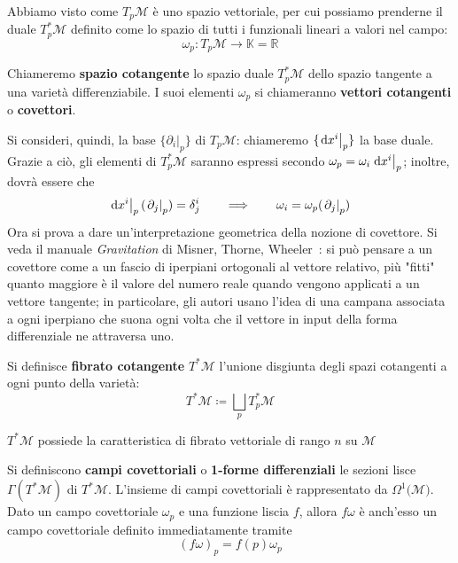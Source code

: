 Abbiamo visto come $T_p\mathcal{M}$ è uno spazio vettoriale, per cui possiamo prenderne il duale $T^*_p\mathcal{M}$ definito come lo spazio di tutti i funzionali lineari a valori nel campo:
\[
    \omega_p : T_p\mathcal{M} \rightarrow \mathbb{K} = \mathbb{R}
\]
\begin{definition}
    Chiameremo \textbf{spazio cotangente} lo spazio duale $T^*_p\mathcal{M}$ dello spazio tangente a una varietà differenziabile.
    I suoi elementi $\omega_p$ si chiameranno \textbf{vettori cotangenti} o \textbf{covettori}.
\end{definition}
Si consideri, quindi, la base $\{ \left.\partial_i\right|_p\}$ di $ T_p\mathcal{M}$: chiameremo $\{ \left.\odif{x^i}\right|_p\}$ la base duale. Grazie a ciò, gli elementi di $T^*_p\mathcal{M}$ saranno espressi secondo $\omega_p = \omega_i \left.\odif{x^i}\right|_p$; inoltre, dovrà essere che
\begin{equation}
    \left.\odif{x^i}\right|_p (\left.\partial_j\right|_p) = \delta^i_j \qquad \Longrightarrow \qquad \omega_i = \omega_p (\left.\partial_j\right|_p)
\end{equation}
Ora si prova a dare un'interpretazione geometrica della nozione di covettore. Si veda il manuale \emph{Gravitation} di Misner, Thorne, Wheeler~\cite[Capitolo 2, Foundations of Special Relativity]{misner-wheeler-thorne_gravitation}: si può pensare a un covettore come a un fascio di iperpiani ortogonali al vettore relativo, più "fitti" quanto maggiore è il valore del numero reale quando vengono applicati a un vettore tangente; in particolare, gli autori usano l'idea di una campana associata a ogni iperpiano che suona ogni volta che il vettore in input della forma differenziale ne attraversa uno. %
\begin{definition}
    Si definisce \textbf{fibrato cotangente} $T^*\mathcal{M}$ l'unione disgiunta degli spazi cotangenti a ogni punto della varietà:
    \begin{equation}
        T^*\mathcal{M} \coloneqq \bigsqcup_p T^*_p\mathcal{M}
    \end{equation}
\end{definition}
\begin{proposition}
    $T^*\mathcal{M}$ possiede la caratteristica di fibrato vettoriale di rango $n$ su $\mathcal{M}$
\end{proposition}
\begin{definition}
    Si definiscono \textbf{campi covettoriali} o \textbf{1-forme differenziali} le sezioni lisce $\Gamma(T^*\mathcal{M})$ di $T^*\mathcal{M}$. L'insieme di campi covettoriali è rappresentato da $\Omega^1(\mathcal{M)}$.
    Dato un campo covettoriale $\omega_p$ e una funzione liscia $f$, allora $f \omega$ è anch'esso un campo covettoriale definito immediatamente tramite
    \begin{equation}
        (f \omega)_p = f(p) \omega_p
    \end{equation}
\end{definition}
